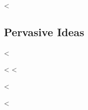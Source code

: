 <%
  \subsection*{Pervasive Ideas}
  \begin{pervasiveitems}
  <%
    \item
      <%
  <%
  \end{pervasiveitems}
<%


<%
